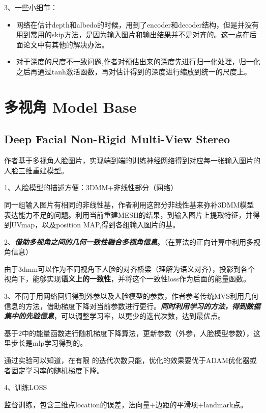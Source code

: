 \documentclass[UTF8,12pt]{article} %
\theoremstyle{definition}
\begin{document}
3、一些小细节：
\begin{itemize}
	\item 网络在估计depth和albedo的时候，用到了encoder和decoder结构，但是并没有用到常用的skip方法，是因为输入图片和输出结果并不是对齐的。这一点在后面论文中有其他的解决办法。
	\item 对于深度的尺度不一致问题,作者对预估出来的深度先进行归一化处理，归一化之后再通过tanh激活函数，再对估计得到的深度进行缩放到统一的尺度上。
\end{itemize}
	
	

	




\section{多视角 Model Base}
\subsection{Deep Facial Non-Rigid Multi-View Stereo}


作者基于多视角人脸图片，实现端到端的训练神经网络得到对应每一张输入图片的人脸三维重建模型。


1、人脸模型的描述方便：3DMM+非线性部分（网络）
	
	同一组输入图片有相同的非线性基，作者利用这部分非线性基来弥补3DMM模型表达能力不足的问题。利用当前重建MESH的结果，到输入图片上提取特征，并得到UVmap，以及position MAP,得到各组输入图片的基。
	
	
2、\textit{\textbf{借助多视角之间的几何一致性融合多视角信息}}。（在算法的正向计算中利用多视角信息）
	
	由于3dmm可以作为不同视角下人脸的对齐桥梁（理解为语义对齐），投影到各个视角下，能够实现\textbf{语义上的一致性}，并将这个一致性loss作为后面的能量函数。
	
3、不同于用网络回归得到外参以及人脸模型的参数，作者参考传统MVS利用几何信息的方法，借助梯度下降对当前参数进行更行。\textit{\textbf{同时利用学习的方法，得到数据集中的先验信息}}，可以调整学习率，以更少的迭代次数，达到最优点。

	基于2中的能量函数进行随机梯度下降算法，更新参数（外参，人脸模型参数），这里步长是mlp学习得到的。
	
	通过实验可以知道，在有限 的迭代次数只能，优化的效果要优于ADAM优化器或者固定学习率的随机梯度下降。

4、训练LOSS
	
	监督训练，包含三维点location的误差，法向量+边距的平滑项+landmark点。
\end{document}
